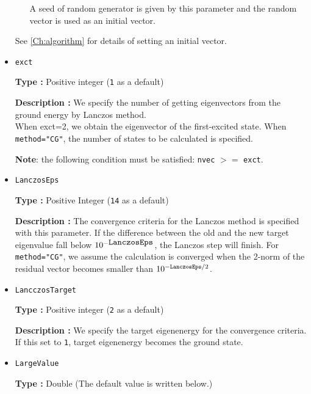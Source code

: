 \begin{itemize}
\begin{itemize}
A seed of random generator is given by this parameter and the random vector is used as an initial vector.
\end{itemize}
See \ref{Ch:algorithm} for details of setting an initial vector.




\item \verb|exct|

{\bf Type :} Positive integer (\verb|1| as a default)

{\bf Description :}  We specify the number of getting eigenvectors from the ground energy by Lanczos method.\\
When exct=2, we obtain the eigenvector of the first-excited state.
When \verb|method="CG"|, the number of states to be calculated is specified.

{\bf Note}:  the following condition must be satisfied: \verb|nvec| $>=$ \verb|exct|.

\item \verb|LanczosEps|

{\bf Type :} Positive Integer (\verb|14| as a default)

{\bf Description :} The convergence criteria for the Lanczos method is specified with this parameter.
If the difference between the old and the new target eigenvalue fall below $10^{- \verb|LanczosEps|}$, 
the Lanczos step will finish.
For \verb|method="CG"|, we assume the calculation is converged
when the 2-norm of the residual vector becomes smaller than $10^{-{\tt LanczosEps}/2}$.

\item \verb|LancczosTarget|

{\bf Type :} Positive integer (\verb|2| as a default)

{\bf Description :} We specify the target eigenenergy for the convergence criteria.
If this set to \verb|1|, target eigenenergy becomes the ground state.

\item \verb|LargeValue|

{\bf Type :} Double (The default value is written below.)


\end{itemize}

